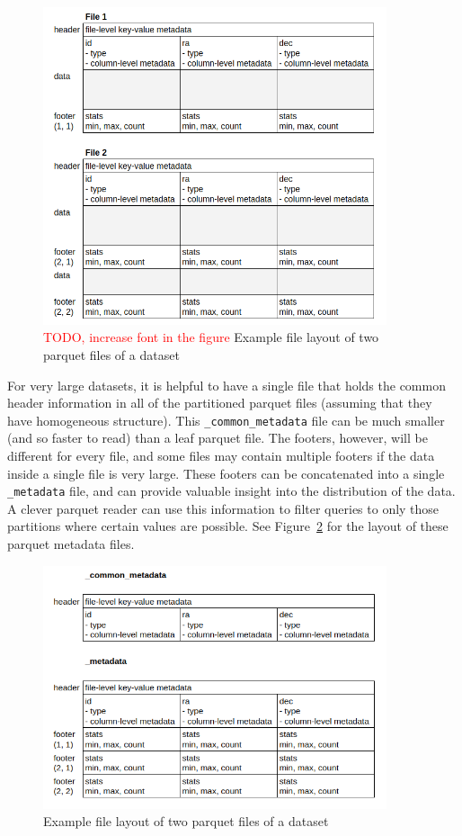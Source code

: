 \documentclass[11pt,a4paper]{ivoa}
\begin{document}
\begin{figure}
\centering
\includegraphics[width=0.9\textwidth]{leaf_files.png}
\caption{\textcolor{red}{TODO, increase font in the figure } Example file layout of two parquet files of a dataset}
\label{fig:partitionedParquet}
\end{figure}

For very large datasets, it is helpful to have a single file that holds the common header information in all of the partitioned parquet files (assuming that they have homogeneous structure).
This \texttt{\_common\_metadata} file can be much smaller (and so faster to read) than a leaf parquet file.
The footers, however, will be different for every file, and some files may contain multiple footers if the data inside a single file is very large.
These footers can be concatenated into a single \texttt{\_metadata} file, and can provide valuable insight into the distribution of the data. 
A clever parquet reader can use this information to filter queries to only those partitions where certain values are possible.
See Figure~\ref{fig:parquetMetadata} for the layout of these parquet metadata files.

\begin{figure}
\centering
\includegraphics[width=0.9\textwidth]{metadata_files.png}
\caption{Example file layout of two parquet files of a dataset}
\label{fig:parquetMetadata}
\end{figure}
\end{document}
